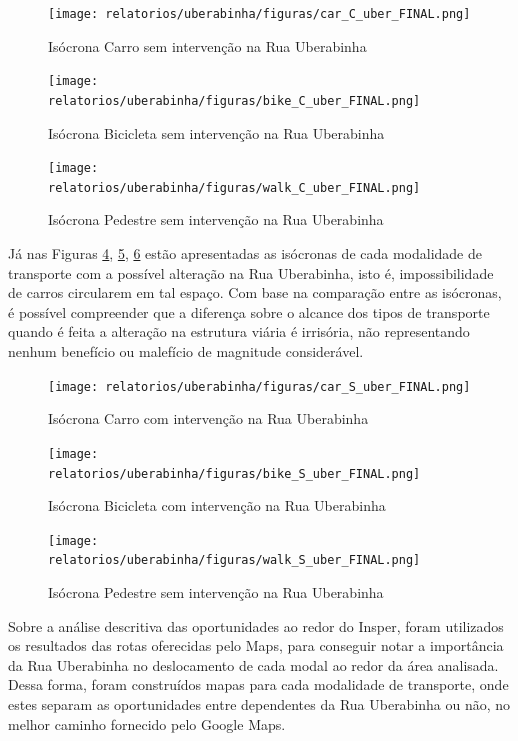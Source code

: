 \begin{figure}[H]
    \centering
    \caption{Isócrona Carro sem intervenção na Rua Uberabinha}
    \texttt{[image: relatorios/uberabinha/figuras/car\_C\_uber\_FINAL.png]}
    \label{fig:iso_car_C}
\end{figure}

\begin{figure}[H]
    \centering
    \caption{Isócrona Bicicleta sem intervenção na Rua Uberabinha}
    \texttt{[image: relatorios/uberabinha/figuras/bike\_C\_uber\_FINAL.png]}
    \label{fig:iso_bike_C}
\end{figure}

\begin{figure}[H]
    \centering
    \caption{Isócrona Pedestre sem intervenção na Rua Uberabinha}
    \texttt{[image: relatorios/uberabinha/figuras/walk\_C\_uber\_FINAL.png]}
    \label{fig:iso_pe_C}
\end{figure}

Já nas Figuras \ref{fig:iso_car_S}, \ref{fig:iso_bike_S}, \ref{fig:iso_pe_S} estão apresentadas as isócronas de cada modalidade de transporte com a possível alteração na Rua Uberabinha, isto é, impossibilidade de carros circularem em tal espaço. Com base na comparação entre as isócronas, é possível compreender que a diferença sobre o alcance dos tipos de transporte quando é feita a alteração na estrutura viária é irrisória, não representando nenhum benefício ou malefício de magnitude considerável.

\begin{figure}[H]
    \centering
    \caption{Isócrona Carro com intervenção na Rua Uberabinha}
    \texttt{[image: relatorios/uberabinha/figuras/car\_S\_uber\_FINAL.png]}
    \label{fig:iso_car_S}
\end{figure}

\begin{figure}[H]
    \centering
    \caption{Isócrona Bicicleta com intervenção na Rua Uberabinha}
    \texttt{[image: relatorios/uberabinha/figuras/bike\_S\_uber\_FINAL.png]}
    \label{fig:iso_bike_S}
\end{figure}

\begin{figure}[H]
    \centering
    \caption{Isócrona Pedestre sem intervenção na Rua Uberabinha}
    \texttt{[image: relatorios/uberabinha/figuras/walk\_S\_uber\_FINAL.png]}
    \label{fig:iso_pe_S}
\end{figure}

Sobre a análise descritiva das oportunidades ao redor do Insper, foram utilizados os resultados das rotas oferecidas pelo Maps, para conseguir notar a importância da Rua Uberabinha no deslocamento de cada modal ao redor da área analisada. Dessa forma, foram construídos mapas para cada modalidade de transporte, onde estes separam as oportunidades entre dependentes da Rua Uberabinha ou não, no melhor caminho fornecido pelo Google Maps. 


